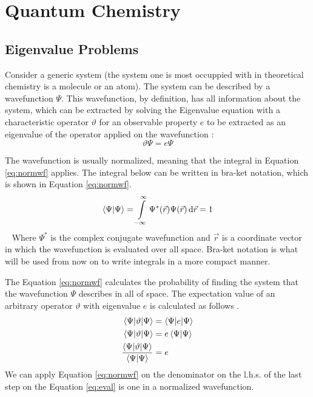 \documentclass[../master_thesis.tex]{subfiles}
\begin{document}
\chapter{Quantum Chemistry}
\section{Eigenvalue Problems}
Consider a generic system (the system one is most occuppied with in theoretical
chemistry is a molecule or an atom). The system can be described by a
wavefunction $\Psi$. This wavefunction, by definition, has all information
about the system, which can be extracted by solving the Eigenvalue equation
with a characteristic operator $\vartheta$ for an observable property $ e $ to
be extracted as an eigenvalue of the operator applied on the wavefunction
\cite{Cramer:2004}:
\begin{equation}
  \vartheta\Psi = e\Psi\label{eq:eigenequation}
\end{equation}

The wavefunction is usually normalized, meaning that the integral in Equation
\ref{eq:normwf} applies. The integral below can be written in bra-ket
\cite{Jensen:2017} notation, which is shown in Equation \ref{eq:normwf}.
\begin{equation}
  \braket{\Psi|\Psi} = \int\limits_{-\infty}^{\infty}
  \Psi^*(\vec{r})\Psi(\vec{r})\mathrm{\,d}\vec{r} = 1\label{eq:normwf}
\end{equation} 
Where $\Psi^*$ is the complex conjugate wavefunction and $\vec{r}$ is a
coordinate vector in which the wavefunction is evaluated over all space.
Bra-ket notation is what will be used from now on to write integrals in a more
compact manner.

The Equation \ref{eq:normwf} calculates the probability of finding the system
that the wavefunction $\Psi$ describes in all of space. The expectation value
of an arbitrary operator $\vartheta$ with eigenvalue $e$ is calculated as
follows \cite{Atkins:2014}.
\begin{equation}
  \begin{aligned}
  \braket{\Psi|\vartheta|\Psi} &= \braket{\Psi|e|\Psi} \\
   \braket{\Psi|\vartheta|\Psi}&= e\braket{\Psi|\Psi} \\
   \frac{\braket{\Psi|\vartheta|\Psi}}{\braket{\Psi|\Psi}}&= e\label{eq:eval}
  \end{aligned}
\end{equation}
We can apply Equation \ref{eq:normwf} on the denominator on the l.h.s. of the
last step on the Equation \ref{eq:eval} is one in a normalized wavefunction.
\end{document}
